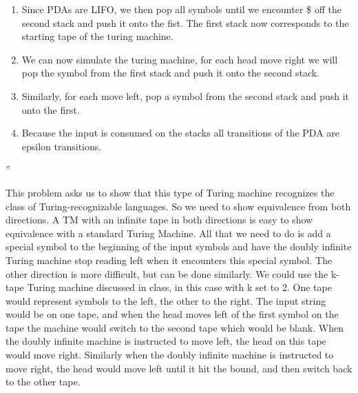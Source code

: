 \begin{problem}{5}
\begin{solution}
\begin{itemize}
\begin{enumerate}
          \item Since PDAs are LIFO, we then pop all symbols until we encounter \$ off the second stack and push it onto the fist.  The first stack now corresponds to the starting tape of the turing machine. \\
          \item We can now simulate the turing machine, for each head move right we will pop the symbol from the first stack and push it onto the second stack. \\
          \item Similarly, for each move left, pop a symbol from the second stack and push it onto the first. \\
          \item Because the input is consumed on the stacks all transitions of the PDA are epsilon transitions.
        \end{enumerate}
      ''
    \end{itemize}
  \end{solution}
\end{problem}

\begin{problem}{6}
  \begin{solution}
    This problem asks us to show that this type of Turing machine recognizes the class of Turing-recognizable languages.
    So we need to show equivalence from both directions.
    \br
    A TM with an infinite tape in both directions is easy to show equivalence with a standard Turing Machine.  All that
    we need to do is add a special symbol to the beginning of the input symbols and have the doubly infinite Turing
    machine stop reading left when it encounters this special symbol.
    \br
    The other direction is more difficult, but can be done similarly.  We could use the k-tape Turing machine discussed
    in class, in this case with k set to 2.  One tape would represent symbols to the left, the other to the right. The
    input string would be on one tape, and when the head moves left of the first symbol on the tape the machine would
    switch to the second tape which would be blank. When the doubly infinite machine is instructed to move left, the
    head on this tape would move right.  Similarly when the doubly infinite machine is instructed to move right, the
    head would move left until it hit the bound, and then switch back to the other tape.
  \end{solution}
\end{problem}

